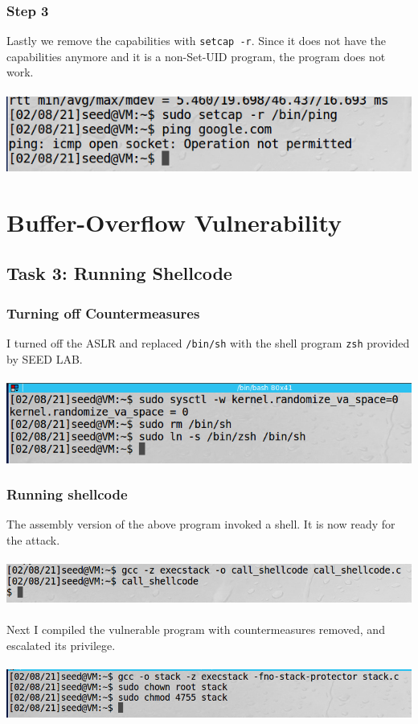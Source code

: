 \documentclass[a4paper]{article}
\begin{document}
\subsubsection{Step 3}
Lastly we remove the capabilities with \verb+setcap -r+. Since it does not have the capabilities anymore and it is a non-Set-UID program, the program does not work.\\\\
\includegraphics[scale=0.7]{1/9.png}\\
\pagebreak
\section{Buffer-Overflow Vulnerability}
\subsection{Task 3: Running Shellcode}
\subsubsection{Turning off Countermeasures}
I turned off the ASLR and replaced \verb+/bin/sh+ with the shell program \verb+zsh+ provided by SEED LAB.\\\\
\includegraphics[scale=0.7]{2/1.png}
\subsubsection{Running shellcode}
The assembly version of the above program invoked a shell. It is now ready for the attack.\\\\
\includegraphics[scale=0.7]{2/2.png}\\\\
Next I compiled the vulnerable program with countermeasures removed, and escalated its privilege.\\\\
\includegraphics[scale=0.7]{2/3.png}
\end{document}
